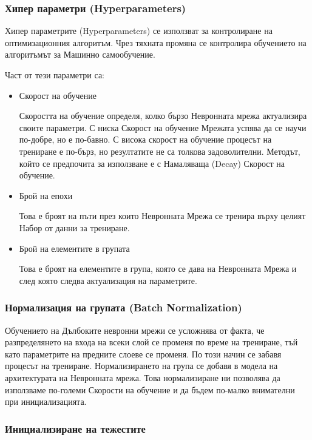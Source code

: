 \documentclass{article}
\begin{document}
\subsubsection{Хипер параметри (Hyperparameters)}

Хипер параметрите (Hyperparameters) се използват за контролиране на оптимизационния алгоритъм. Чрез тяхната промяна се
контролира обучението на алгоритъмът за Машинно самообучение. \cite{deep-learning-practitioner}

Част от тези параметри са:

\begin{itemize}

  \item Скорост на обучение

  Скоростта на обучение определя, колко бързо Невронната мрежа актуализира своите параметри. С ниска Скорост на
  обучение Мрежата успява да се научи по-добре, но е по-бавно. С висока скорост на обучение процесът на трениране е
  по-бърз, но резултатите не са толкова задоволителни. Методът, който се предпочита за използване е с Намаляваща
  (Decay) Скорост на обучение.

  \item Брой на епохи

  Това е броят на пъти през които Невронната Мрежа се тренира върху целият Набор от данни за трениране.

  \item Брой на елементите в групата

  Това е броят на елементите в група, която се дава на Невронната Мрежа и след която следва актуализация на параметрите.

\end{itemize}

\subsubsection{Нормализация на групата (Batch Normalization)}

Обучението на Дълбоките невронни мрежи се усложнява от факта, че разпределянето на входа на всеки слой се променя по
време на трениране, тъй като параметрите на предните слоеве се променя. По този начин се забавя процесът на трениране.
Нормализирането на група се добавя в модела на архитектурата на Невронната мрежа. Това нормализиране ни позволява да
използваме по-големи Скорости на обучение и да бъдем по-малко внимателни при инициализацията. \cite{batch-normalization}

\subsubsection{Инициализиране на тежестите}
\end{document}
